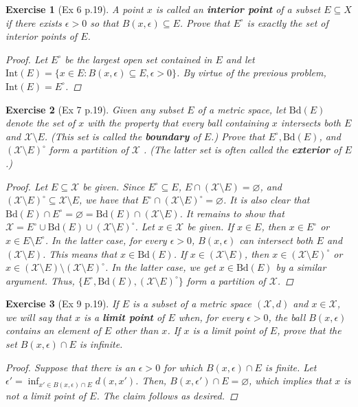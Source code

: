 \documentclass[11pt]{article}
\newtheorem{exercise}{Exercise}
\begin{document}
\begin{exercise}[Ex 6 p.19]
	A point $x$ is called an \textbf{interior point} of a subset $E \subseteq X $ if there exists $\epsilon > 0$
	so that $B(x, \epsilon) \subseteq E$. Prove that $E^\circ$
	is exactly the set of interior points of $E$.
	\begin{proof}
		Let $E^\circ$ be the largest open set contained in $E$ and let $\mbox{Int}(E) = \{ x\in E : B(x,\epsilon) \subseteq E, \epsilon >0 \}$. By virtue of the previous problem, $\mbox{Int}(E) = E^\circ$. 
	\end{proof}
\end{exercise}

\begin{exercise}[Ex 7 p.19]
	Given any subset $E$ of a metric space, let $\mbox{Bd}(E)$ denote the set of $x$ with the
	property that every ball containing $x$ intersects both $E$ and $\mathcal{X} \setminus E$. (This set
	is called the \textbf{boundary} of $E$.) Prove that $E^\circ, \mbox{Bd}(E)$, and $(\mathcal{X} \setminus  E)^\circ$ form a partition of $\mathcal{X}$ . (The latter set is often called the \textbf{exterior} of $E$.)
	\begin{proof}
		Let $E \subseteq \mathcal{X}$ be given. Since $E^\circ \subseteq E$, $E \cap (\mathcal{X}\setminus E) = \varnothing$, and $(\mathcal{X}\setminus E)^\circ \subseteq \mathcal{X}\setminus E$, we have that $E^\circ \cap (\mathcal{X}\setminus E)^\circ = \varnothing$. It is also clear that $\mbox{Bd}(E) \cap E^\circ = \varnothing = \mbox{Bd}(E) \cap (\mathcal{X}\setminus E)$. It remains to show that $\mathcal{X} = E^\circ \cup \mbox{Bd}(E) \cup (\mathcal{X}\setminus E)^\circ$. Let $x\in \mathcal{X}$ be given. If $x\in E$, then $x \in E^\circ$ or $x\in E\setminus E^\circ$. In the latter case, for every $\epsilon >0$, $B(x,\epsilon)$ can intersect both $E$ and $(\mathcal{X}\setminus E)$. This means that $x\in \mbox{Bd}(E)$. If $x\in (\mathcal{X}\setminus E)$, then $x\in (\mathcal{X}\setminus E)^\circ$ or $x \in (\mathcal{X}\setminus E)\setminus (\mathcal{X}\setminus E)^\circ$. In the latter case, we get $x\in \mbox{Bd}(E)$ by a similar argument. Thus, $\{ E^\circ, \mbox{Bd}(E), (\mathcal{X}\setminus E)^\circ \}$ form a partition of $\mathcal{X}$.  
	\end{proof}
\end{exercise}

\begin{exercise}[Ex 9 p.19]
	If $E$ is a subset of a metric space $(\mathcal{X} , d)$ and $x \in \mathcal{X}$, we will say that $x$ is a
	\textbf{limit point} of $E$ when, for every $\epsilon > 0$, the ball $B(x, \epsilon)$ contains an element
	of $E$ other than $x$. If $x$ is a limit point of $E$, prove that the set $B(x, \epsilon) \cap E$ is infinite.
	\begin{proof}
		Suppose that there is an $\epsilon >0$ for which $B(x,\epsilon) \cap E$ is finite. Let $\epsilon' = \inf_{x'\in B(x,\epsilon)\cap E}d(x,x')$. Then, $B(x,\epsilon') \cap E = \varnothing$, which implies that $x$ is not a limit point of $E$. The claim follows as desired. 
	\end{proof}
\end{exercise}
\end{document}
